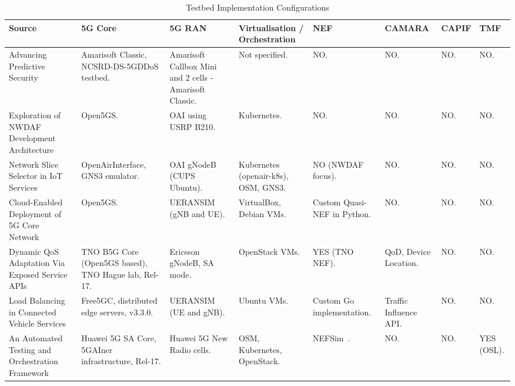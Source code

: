 \begin{table}[ht]
\centering
\tiny
\renewcommand{\arraystretch}{1.3} %
\caption{Testbed Implementation Configurations}
\label{tab:testbeds:description}
\begin{tabular}{p{2cm} p{2cm} p{2cm} p{2cm} p{1.4cm} p{1.4cm} p{1.4cm} p{1.4cm}}
\toprule
\textbf{Source} & \textbf{\acs{5G} Core} & \textbf{\acs{5G} \acs{RAN}} & \textbf{Virtualisation / Orchestration} & \textbf{\acs{NEF}} & \textbf{CAMARA} & \textbf{\acs{CAPIF}} & \textbf{\acs{TMF}} \\
\midrule
Advancing Predictive Security~\cite{AdvancingPredictiveSecurity} & Amarisoft Classic, NCSRD-DS-5GDDoS testbed. & Amarisoft Callbox Mini and 2 cells - Amarisoft Classic. & Not specified. & NO. & NO. & NO. & NO. \\
Exploration of \acs{NWDAF} Development Architecture~\cite{ExplorationNWDAFDevelopmentArchitecture6G} & Open5GS. & \acs{OAI} using \acs{USRP} B210. & Kubernetes. & NO. & NO. & NO. & NO. \\
Network Slice Selector in \acs{IoT} Services~\cite{NetworkSliceSelectorIoT} & OpenAirInterface, GNS3 emulator. & \acs{OAI} gNodeB (CUPS Ubuntu). & Kubernetes (openair-k8s), \acs{OSM}, GNS3. & NO (\acs{NWDAF} focus). & NO. & NO. & NO. \\
Cloud-Enabled Deployment of \acs{5G} Core Network~\cite{CloudEnabledDeployment5GN} & Open5GS. & UERANSIM (\acs{gNB} and \acs{UE}). & VirtualBox, Debian \acsp{VM}. & Custom Quasi-NEF in Python. & NO. & NO. & NO. \\
Dynamic QoS Adaptation Via Exposed Service \acsp{API}~\cite{DynamicQoSAdaptationviaExposedServiceAPIs} & TNO \acs{B5G} Core (Open5GS based), TNO Hague lab, Rel-17. & Ericsson gNodeB, \acs{SA} mode. & OpenStack \acsp{VM}. & YES (TNO \acs{NEF}). & \acs{QoD}, Device Location. & NO. & NO. \\
Load Balancing in Connected Vehicle Services~\cite{LoadBalancingConnectedVehicleServices} & Free5GC, distributed edge servers, v3.3.0. & UERANSIM (\acs{UE} and \acs{gNB}). & Ubuntu \acsp{VM}. & Custom Go implementation. & Traffic Influence \acs{API}. & NO. & NO. \\
An Automated Testing and Orchestration Framework~\cite{AutomatedTestingOrchestrationFramework} & Huawei \acs{5G} \acs{SA} Core, 5GAIner infrastructure, Rel-17. & Huawei \acs{5G} New Radio cells. & \acs{OSM}, Kubernetes, OpenStack. & NEFSim~\cite{NEFSimMediaNetLabGithub}. & NO. & NO. & YES (\acs{OSL}). \\

\end{tabular}
\end{table}
